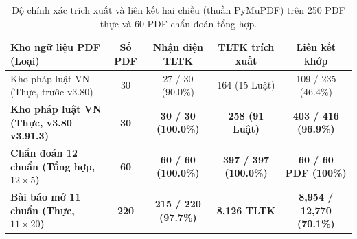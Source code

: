 {\setlength{\tabcolsep}{3.5pt}
\begin{table}[!htbp]
\centering
\caption{Độ chính xác trích xuất và liên kết hai chiều (thuần PyMuPDF) trên 250 PDF thực và 60 PDF chẩn đoán tổng hợp.}\label{tab:pdf-corpora}
\begin{tabular}{|L{0.34}|C{0.10}|C{0.18}|C{0.19}|C{0.19}|}
\hline
\textbf{Kho ngữ liệu PDF (Loại)} & \textbf{Số PDF} & \textbf{Nhận diện TLTK} & \textbf{TLTK trích xuất} & \textbf{Liên kết khớp} \\
\hline
Kho pháp luật VN (Thực, trước v3.80) & 30 & 27 / 30 (90.0\%) & 164 (15 Luật) & 109 / 235 (46.4\%) \\
\hline
\textbf{Kho pháp luật VN (Thực, v3.80--v3.91.3)} & \textbf{30} & \textbf{30 / 30 (100.0\%)} & \textbf{258 (91 Luật)} & \textbf{403 / 416 (96.9\%)} \\
\hline
\textbf{Chẩn đoán 12 chuẩn (Tổng hợp, $12 \times 5$)} & \textbf{60} & \textbf{60 / 60 (100.0\%)} & \textbf{397 / 397 (100.0\%)} & \textbf{60 / 60 PDF (100\%)} \\
\hline
\textbf{Bài báo mở 11 chuẩn (Thực, $11 \times 20$)} & \textbf{220} & \textbf{215 / 220 (97.7\%)} & \textbf{8,126 TLTK} & \textbf{8,954 / 12,770 (70.1\%)} \\
\hline
\end{tabular}
\end{table}
}

